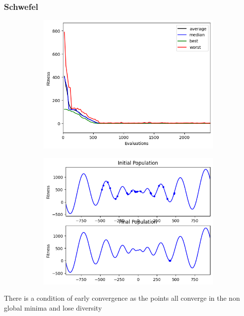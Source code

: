 \subsubsection{Schwefel}
\begin{figure}[H]
    \centering
    \begin{subfigure}[t]{0.5\textwidth}
        \centering
        \includegraphics[width=\linewidth]{images/lab2/sch_eval.png}
    \end{subfigure}%
    \begin{subfigure}[t]{0.5\textwidth}
        \centering
        \includegraphics[width=\linewidth]{images/lab2/sch_pop.png}
    \end{subfigure}
\end{figure}
There is a condition of early convergence as the points all converge in the non global minima and lose diversity

